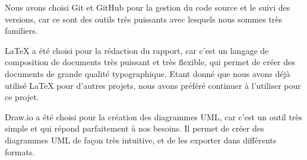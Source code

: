 Nous avons choisi Git et GitHub pour la gestion du code source et le suivi des
versions, car ce sont des outils très puissants avec lesquels nous sommes très
familiers.

LaTeX a été choisi pour la rédaction du rapport, car c'est un langage de
composition de documents très puissant et très flexible, qui permet de créer des
documents de grande qualité typographique.
Etant donné que nous avons déjà utilisé LaTeX pour d'autres projets, nous avons
préféré continuer à l'utiliser pour ce projet.

Draw.io a été choisi pour la création des diagrammes UML, car c'est un outil très
simple et qui répond parfaitement à nos besoins. Il permet de créer des diagrammes
UML de façon très intuitive, et de les exporter dans différents formats.

